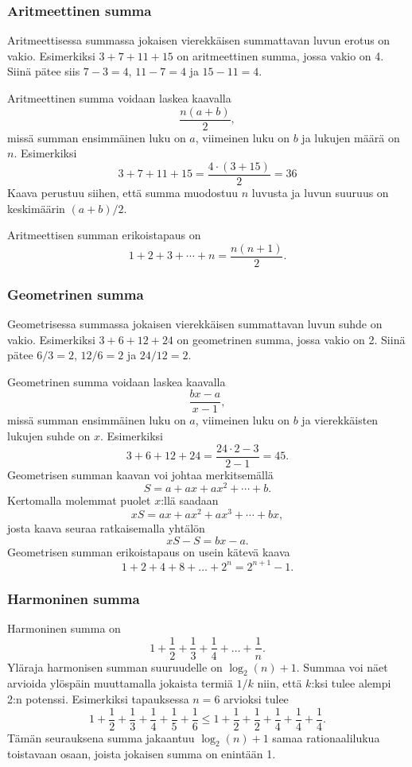 \subsubsection{Aritmeettinen summa}


Aritmeettisessa summassa jokaisen vierekkäisen
summattavan luvun erotus on vakio.
Esimerkiksi $3+7+11+15$ on aritmeettinen summa,
jossa vakio on 4.
Siinä pätee siis $7-3=4$, $11-7=4$ ja $15-11=4$.

Aritmeettinen summa voidaan laskea kaavalla
\[\frac{n(a+b)}{2},\]
missä summan ensimmäinen luku on $a$,
viimeinen luku on $b$ ja lukujen määrä on $n$.
Esimerkiksi
\[3+7+11+15=\frac{4 \cdot (3+15)}{2} = 36\]
Kaava perustuu siihen, että summa muodostuu $n$ luvusta
ja luvun suuruus on keskimäärin $(a+b)/2$.

Aritmeettisen summan erikoistapaus on
\[1+2+3+\cdots+n = \frac{n(n+1)}{2}.\]

\subsubsection{Geometrinen summa}


Geometrisessa summassa jokaisen vierekkäisen
summattavan luvun suhde on vakio.
Esimerkiksi $3+6+12+24$ on geometrinen summa,
jossa vakio on 2.
Siinä pätee $6/3=2$, $12/6=2$ ja $24/12=2$.

Geometrinen summa voidaan laskea kaavalla
\[\frac{bx-a}{x-1},\]
missä summan ensimmäinen luku on $a$,
viimeinen luku on $b$ ja vierekkäisten lukujen suhde on $x$.
Esimerkiksi
\[3+6+12+24=\frac{24 \cdot 2 - 3}{2-1} = 45.\]
Geometrisen summan kaavan voi johtaa merkitsemällä
\[ S = a + ax + ax^2 + \cdots + b .\] 
Kertomalla molemmat puolet $x$:llä saadaan
\[ xS = ax + ax^2 + ax^3 + \cdots + bx,\]
josta kaava seuraa ratkaisemalla yhtälön
\[ xS-S = bx-a.\]
Geometrisen summan erikoistapaus on usein kätevä kaava
\[1+2+4+8+\ldots+2^n=2^{n+1}-1.\]

\subsubsection{Harmoninen summa}


Harmoninen summa on
\[ 1+\frac{1}{2}+\frac{1}{3}+\frac{1}{4}+\ldots+\frac{1}{n}.\]
Yläraja harmonisen summan suuruudelle on $\log_2(n)+1$.
Summaa voi näet arvioida ylöspäin
muuttamalla jokaista termiä $1/k$ niin,
että $k$:ksi tulee alempi 2:n potenssi.
Esimerkiksi tapauksessa $n=6$ arvioksi tulee
\[ 1+\frac{1}{2}+\frac{1}{3}+\frac{1}{4}+\frac{1}{5}+\frac{1}{6} \le
1+\frac{1}{2}+\frac{1}{2}+\frac{1}{4}+\frac{1}{4}+\frac{1}{4}.\]
Tämän seurauksena summa jakaantuu $\log_2(n)+1$ samaa
rationaalilukua toistavaan osaan, joista jokaisen summa on enintään 1.

